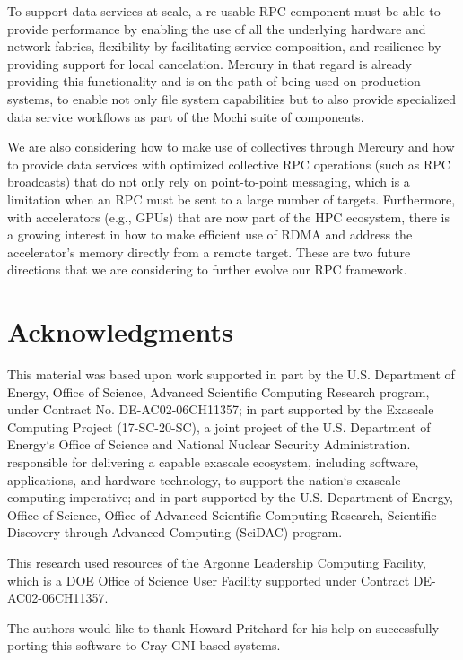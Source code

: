 \documentclass[11pt]{article}
\begin{document}
To support data services at scale, a re-usable RPC component must be able
to provide performance by enabling the use of all the underlying hardware and
network fabrics, flexibility by facilitating service composition, and resilience
by providing support for local cancelation. Mercury in that regard is
already providing this functionality and is on the path of being used on
production systems, to enable not only file system capabilities but to also
provide specialized data service workflows as part of the Mochi suite of
components.

We are also considering how to make use of
collectives through Mercury and how to provide data services with
optimized collective RPC operations (such as RPC broadcasts) that do not only
rely on point-to-point messaging, which is a limitation when an RPC
must be sent to a large number of targets.
Furthermore, with accelerators (e.g., GPUs) that are now part of the HPC ecosystem, there
is a growing interest in how to make efficient use of RDMA and address the accelerator's 
memory directly from a remote target. These are two future directions
that we are considering to further evolve our RPC framework.

\section*{Acknowledgments}

This material was based upon work supported in part by the U.S. Department
of Energy, Office of Science, Advanced Scientific Computing Research
program, under Contract No. DE-AC02-06CH11357; in part supported by
the Exascale Computing Project (17-SC-20-SC), a joint project of the
U.S. Department of Energy`s Office of Science and National Nuclear
Security Administration.  responsible for delivering a capable exascale
ecosystem, including software, applications, and hardware technology,
to support the nation`s exascale computing imperative; and in part
supported by the U.S. Department of Energy, Office of Science, Office
of Advanced Scientific Computing Research, Scientific Discovery through
Advanced Computing (SciDAC) program.

This research used resources of the Argonne Leadership Computing
Facility, which is a DOE Office of Science User Facility supported
under Contract DE-AC02-06CH11357.

The authors would like to thank Howard Pritchard for his help on
successfully porting this software to Cray GNI-based systems.
\end{document}

